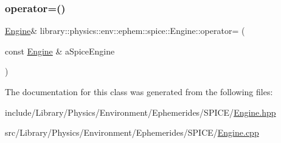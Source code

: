 \subsubsection{\texorpdfstring{operator=()}{operator=()}}
{\footnotesize\ttfamily \hyperlink{classlibrary_1_1physics_1_1env_1_1ephem_1_1spice_1_1_engine}{Engine}\& library\+::physics\+::env\+::ephem\+::spice\+::\+Engine\+::operator= (\begin{DoxyParamCaption}\item[{const \hyperlink{classlibrary_1_1physics_1_1env_1_1ephem_1_1spice_1_1_engine}{Engine} \&}]{a\+Spice\+Engine }\end{DoxyParamCaption})\hspace{0.3cm}{\ttfamily [delete]}}



The documentation for this class was generated from the following files\+:\begin{DoxyCompactItemize}
\item 
include/\+Library/\+Physics/\+Environment/\+Ephemerides/\+S\+P\+I\+C\+E/\hyperlink{_engine_8hpp}{Engine.\+hpp}\item 
src/\+Library/\+Physics/\+Environment/\+Ephemerides/\+S\+P\+I\+C\+E/\hyperlink{_engine_8cpp}{Engine.\+cpp}\end{DoxyCompactItemize}
